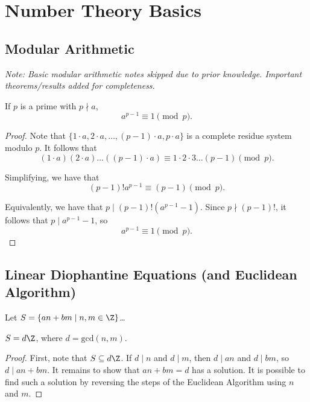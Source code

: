 \documentclass[11pt]{article}
\begin{document}
\newpage

\section{Number Theory Basics}
\subsection{Modular Arithmetic}

\textit{Note: Basic modular arithmetic notes skipped due to prior knowledge. Important theorems/results added for completeness.}

\begin{theorem}
If $p$ is a prime with $p \nmid a$, 
\[
    a^{p-1} \equiv 1 \pmod p.
\]
\end{theorem}

\begin{proof}
Note that $\{ 1\cdot a, 2\cdot a, \dots, (p-1)\cdot a, p\cdot a\}$
is a complete residue system modulo $p$. It follows that
\[
    (1\cdot a)(2\cdot a) \dots ((p-1) \cdot a) \equiv 1\cdot 2\cdot 3 \dots (p-1) \pmod p.
\]

Simplifying, we have that
\[
    (p-1)! a^{p-1} \equiv (p-1) \pmod p.
\]

Equivalently, we have that $p \mid (p-1)! \left( a^{p-1} - 1 \right).$ Since $p \nmid (p-1)!$, it follows that $p \mid a^{p-1} - 1$, so
\[
    a^{p-1} \equiv 1 \pmod p.
\]
\end{proof}

\subsection{Linear Diophantine Equations (and Euclidean Algorithm)}
Let $S = \{  an + bm \mid n, m \in \Z \}$\dots
\begin{theorem}
$S = d\Z$, where $d = \mathrm{gcd}(n, m).$  
\end{theorem}

\begin{proof}
First, note that $S \subseteq d\Z$. If $d \mid n$ and $d \mid m$, then $d \mid an$ and $d \mid bm$, so $d \mid an + bm$. 
It remains to show that $an + bm = d$ has a solution. It is possible to find such a solution by reversing the steps of the Euclidean Algorithm using $n$ and $m$.
\end{proof}
\end{document}
